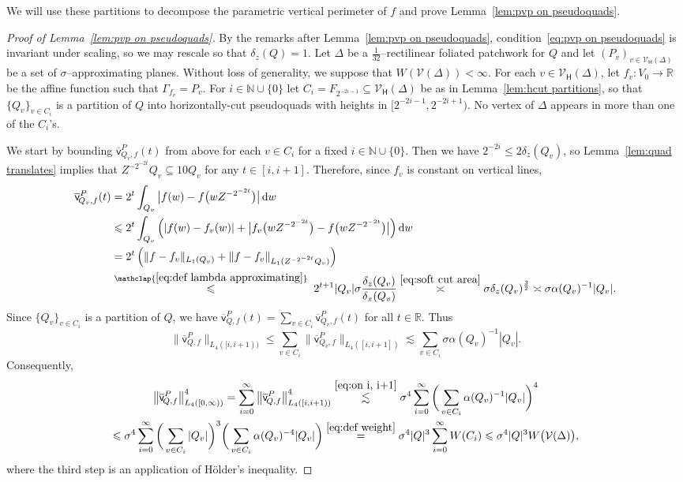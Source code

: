 \documentclass[11pt,reqno]{amsart}
\newcommand{\N}{\mathbb{N}}
\newcommand{\R}{\mathbb{R}}
\newcommand{\cV}{\mathcal{V}}
\renewcommand{\approx}{\asymp}
\newcommand{\ud}[0]{\,\mathrm{d}}
\newcommand{\0}{\mathbf{0}}
\renewcommand{\1}{\mathbf 1}
\newcommand{\from}{\colon}
\renewcommand{\subset}{\subseteq}
\renewcommand{\le}{\leqslant}
\theoremstyle{remark}
\newcommand{\vpP}[1]{{\overline{\mathsf{v}}^{P}_{\!#1}}}
\newcommand{\cVh}{{\mathcal{V}_{\mathsf{H}}}}
\begin{document}
We will use these partitions to decompose the parametric vertical perimeter of $f$ and prove Lemma~\ref{lem:pvp on pseudoquads}.
\begin{proof}[{Proof of Lemma~\ref{lem:pvp on pseudoquads}}]
  By the remarks after Lemma~\ref{lem:pvp on pseudoquads}, condition~\eqref{eq:pvp on pseudoquads} is invariant under scaling, so we may rescale so that $\delta_z(Q)=1$.  Let $\Delta$ be a $\frac{1}{32}$--rectilinear foliated patchwork for $Q$ and let $(P_v)_{v\in \cVh(\Delta)}$ be a set of $\sigma$--approximating planes.
  Without loss of generality, we suppose that $W(\cV(\Delta))<\infty$. For each $v\in \cVh(\Delta)$, let $f_v\from V_0\to \R$ be the affine function such that $\Gamma_{f_v}=P_v$.  For $i\in \N\cup\{0\}$ let $C_i=F_{2^{-2i-1}} \subset \cVh(\Delta)$ be as in Lemma~\ref{lem:hcut partitions}, so that $\{Q_v\}_{v\in C_i}$ is a partition of $Q$ into horizontally-cut pseudoquads with heights in  $[2^{-2i-1} ,2^{-2i+1})$.  No vertex of $\Delta$ appears in more than one of the $C_i$'s.

  We start by bounding  $\vpP{Q_v,f}(t)$ from above for each $v\in C_i$ for a fixed $i\in \N\cup\{0\}$.  Then we have $2^{-2i} \le 2\delta_z(Q_v)$, so Lemma~\ref{lem:quad translates} implies that $Z^{-2^{-2t}} Q_v\subset 10Q_v$ for any $t\in [i,i+1]$.  Therefore, since $f_v$ is constant on vertical lines,
  \begin{align*}
    \vpP{Q_v,f}(t) &= 2^{t} \int_{Q_v} \big|f(w)-f\big(w Z^{-2^{-2t}}\big)\big|\ud w \\
           &\le 2^t \int_{Q_v} \Big(|f(w)-f_v(w)|+\big|f_v\big(w Z^{-2^{-2t}}\big)-f\big(w Z^{-2^{-2t}}\big)\big|\Big)\ud w \\
           &= 2^t \left(\|f-f_v\|_{L_1(Q_v)}+\|f-f_v\|_{L_1(Z^{-2^{-2t}}Q_v)}\right)\\
           &\stackrel{\mathclap{\eqref{eq:def lambda approximating}}}{\le} \;2^{t+1} |Q_v| \sigma  \frac{\delta_z(Q_v)}{\delta_x(Q_v)}
           \stackrel{\eqref{eq:soft cut area}}{\approx} \sigma \delta_z(Q_v)^{\frac{3}{2}} \approx \sigma  \alpha(Q_v)^{-1} |Q_v|.
  \end{align*}
Since  $\{Q_v\}_{v\in C_i}$ is a partition of $Q$, we have $\vpP{Q,f}(t)=\sum_{v\in C_i}\vpP{Q_v,f}(t)$ for all $t\in \R$.  Thus
  \begin{equation}\label{eq:on i, i+1}
    \big\|\vpP{Q,f}\big\|_{L_4([i,i+1))} \le \sum_{v\in C_i} \big\|\vpP{Q_v,f}\big\|_{L_4([i,i+1])} \lesssim \sum_{v\in C_i} \sigma \alpha(Q_v)^{-1} |Q_v|.
  \end{equation}
Consequently,
  \begin{multline*}
    \big\|\vpP{Q,f}\big\|^4_{L_4([0,\infty))}=\sum_{i=0}^\infty \big\|\vpP{Q,f}\big\|^4_{L_4([i,i+1))}\stackrel{\eqref{eq:on i, i+1}}{\lesssim} \sigma^4\sum_{i=0}^\infty\bigg(\sum_{v\in C_i}  \alpha(Q_v)^{-1} |Q_v|\bigg)^4 \\ \le \sigma^4\sum_{i=0}^\infty \bigg(\sum_{v\in C_i}  |Q_v|\bigg)^3\bigg(\sum_{v\in C_i} \alpha(Q_v)^{-4} |Q_v|\bigg)\stackrel{\eqref{eq:def weight}}{=}\sigma^4 |Q|^3\sum_{i=0}^\infty W(C_i)\le \sigma^4 |Q|^3W\big(\cV(\Delta)\big),
    \end{multline*}
where the third step is an application of H\"older's inequality.
\end{proof}
\end{document}

